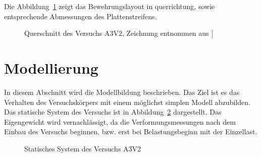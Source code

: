 \documentclass[
  11pt,
  letterpaper,
]{scrreprt}
\begin{document}
Die Abbildung~\ref{fig-qs_a3v2} zeigt das Bewehrungslayout in
querrichtung, sowie entsprechende Abmessungen des Plattenstreifens.

\begin{figure}[H]


\caption{\label{fig-qs_a3v2}Querschnitt des Versuchs A3V2, Zeichnung
entnommen aus {[}\citeproc{ref-gitz_ansatze_2024}{1}{]}}

\end{figure}%

\section{Modellierung}\label{modellierung}

In diesem Abschnitt wird die Modellbildung beschrieben. Das Ziel ist es
das Verhalten des Versuchskörpers mit einem möglichst simplen Modell
abzubilden. Das statische System des Versuchs ist in
Abbildung~\ref{fig-system_a3v2} dargestellt. Das Eigengewicht wird
vernachlässigt, da die Verformungsmessungen nach dem Einbau des Versuchs
beginnen, bzw. erst bei Belastungsbeginn mit der Einzellast.

\begin{figure}[H]


\caption{\label{fig-system_a3v2}Statisches System des Versuchs A3V2}

\end{figure}%
\end{document}
